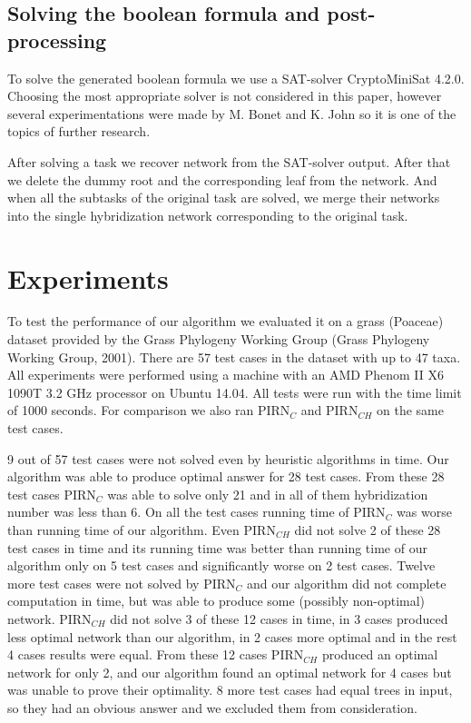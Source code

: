 \documentclass[runningheads, envcountsame, a4paper]{llncs}
\begin{document}
\subsection{Solving the boolean formula and post-processing}

To solve the generated boolean formula we use a SAT-solver CryptoMiniSat 4.2.0. Choosing the most appropriate solver 
is not considered in this paper, however several experimentations were made by M. Bonet and K. John \cite {bonet2009efficiently} 
so it is one of the topics of further research.

After solving a task we recover network from the SAT-solver output. After that we delete the dummy root and the corresponding 
leaf from the network. And when all the subtasks of the original task are solved, we merge their networks into the single 
hybridization network corresponding to the original task.

\section{Experiments}

To test the performance of our algorithm we evaluated it on a grass (Poaceae) dataset provided by the Grass Phylogeny Working Group 
(Grass Phylogeny Working Group, 2001). There are 57 test cases in the dataset with up to 47 taxa. All experiments were performed using a machine with an AMD Phenom II X6 1090T 3.2 GHz 
processor on Ubuntu 14.04. All tests were run with the time limit of 1000 seconds. For comparison we also ran PIRN$_C$ and PIRN$_{CH}$ 
on the same test cases. 

9 out of 57 test cases were not solved even by heuristic algorithms in time. Our algorithm was able to produce optimal answer for 28
test cases. From these 28 test cases PIRN$_C$ was able to solve only 21 and in all of them hybridization number was less than 6. 
On all the test cases running time of PIRN$_C$ was worse than running time of our algorithm.
Even PIRN$_{CH}$ did not solve 2 of these 28 test cases in time and its running time was better than running time of our algorithm only
on 5 test cases and significantly worse on 2 test cases. Twelve more test cases were not solved by PIRN$_C$ and our algorithm did not complete computation 
in time, but was able to produce some (possibly non-optimal) network. PIRN$_{CH}$ did not solve 3 of these 12 cases in time, in 3 cases 
produced less optimal network than our algorithm, in 2 cases more optimal and in the rest 4 cases results were equal. From these 12 cases PIRN$_{CH}$
produced an optimal network for only 2, and our algorithm found an optimal network for 4 cases but was unable to prove their optimality. 
8 more test cases had equal trees in input, so they had an obvious answer and we excluded them from consideration.
\end{document}
